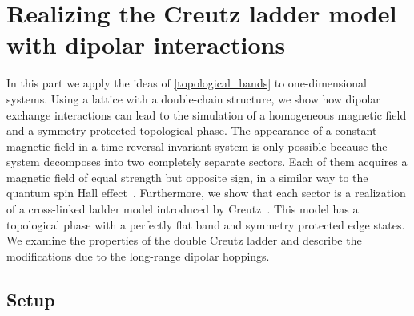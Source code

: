 \chapter[Realizing the Creutz ladder model with dipolar interactions]{Realizing the Creutz ladder model\texorpdfstring{\\}{ }with dipolar interactions}
\label{creutz_ladder}

In this part we apply the ideas of \cref{topological_bands} to one-dimensional systems.
Using a lattice with a double-chain structure, we show how dipolar exchange interactions can lead to the simulation of a homogeneous magnetic field and a symmetry-protected topological phase.
The appearance of a constant magnetic field in a time-reversal invariant system is only possible because the system decomposes into two completely separate sectors.
Each of them acquires a magnetic field of equal strength but opposite sign, in a similar way to the quantum spin Hall effect~\cite{Kane2005a}.
Furthermore, we show that each sector is a realization of a cross-linked ladder model introduced by Creutz~\cite{Creutz1999,Bermudez2009,Tovmasyan2013a,Takayoshi2013,Sticlet2014}.
This model has a topological phase with a perfectly flat band and symmetry protected edge states.
We examine the properties of the double Creutz ladder and describe the modifications due to the long-range dipolar hoppings.

\section{Setup}


